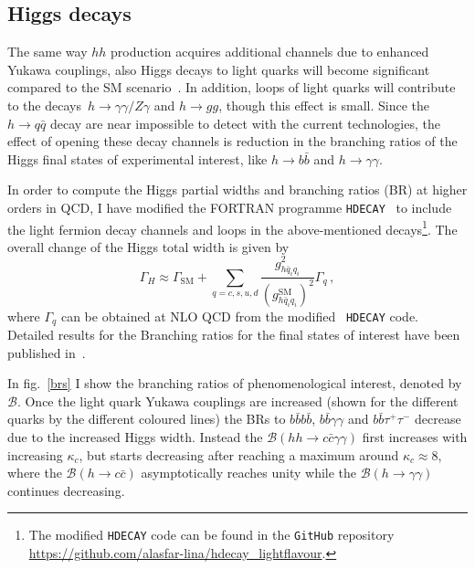 \subsection{Higgs decays \label{sec:Hdecay}}
\par The same way $hh$ production acquires additional channels due to enhanced Yukawa couplings, also Higgs decays to light quarks will become significant compared to the SM scenario~\cite{deFlorian:2016spz}.  In addition, loops of light quarks will contribute to the decays~$h \to \gamma \gamma/Z \gamma$ and $ h \to gg$, though this effect is small.  Since the $ h \to q\bar q$ decay are near impossible to detect with the current technologies, the effect of opening these decay channels is reduction in the branching ratios of the Higgs final states of experimental interest, like $ h \to b \bar b $ and $ h \to \gamma \gamma$. 
\par In order to compute the Higgs partial widths and branching ratios (BR) at higher orders in QCD, I have modified the FORTRAN programme \texttt{HDECAY}~\cite{Djouadi:1997yw,Djouadi:2018xqq} to include the light fermion decay channels and loops in the above-mentioned decays\footnote{The modified \texttt{HDECAY} code can be found in the \texttt{GitHub} repository \url{https://github.com/alasfar-lina/hdecay_lightflavour}.}. The overall change of the Higgs total width is given by
\begin{equation}
	\Gamma_H \approx \Gamma_{\text{SM}}+\sum_{q=c,s,u,d}\frac{g_{h \bar{q}_i q_i}^2}{(g_{h \bar{q}_i q_i}^{\text{SM}})^2}\Gamma_{q}\,,
\end{equation}
where $\Gamma_q$ can be obtained at NLO QCD from the modified ~\texttt{HDECAY} code. Detailed results for the Branching ratios for the final states of interest have been published in~\cite{Alasfar:2019pmn}.
\par In fig.~\ref{brs} I show the branching ratios of phenomenological interest, denoted by $\mathcal{B}$. Once  the light quark Yukawa couplings are increased (shown for the different quarks by the different coloured lines) the BRs to $b\bar{b}b\bar{b}$, $b\bar{b}\gamma\gamma$ and $b\bar{b}\tau^+\tau^-$ decrease due to the increased Higgs width. Instead the $\mathcal{B}(hh\to c\bar{c}\gamma\gamma)$ first increases with increasing $\kappa_c$, but starts decreasing after reaching a maximum around $\kappa_c\approx 8$, where the $\mathcal{B}(h\to c\bar{c})$ asymptotically reaches unity while the $\mathcal{B}(h\to \gamma \gamma)$ continues decreasing.

